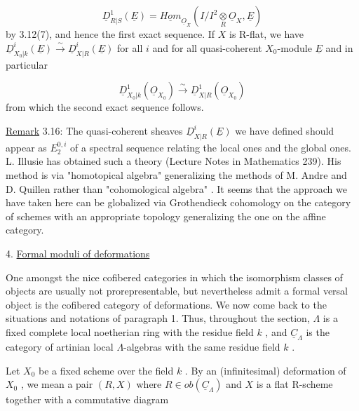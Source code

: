 \begin{equation*}
\underline{D}^1_{R|S}(\underline{E}) = \underline{Hom}_{\underline{O}_X}(I/I^2\underset{R}{\otimes}\underline{O}_X, \underline{E})
\end{equation*}
by 3.12(7), and hence the first exact sequence. If  $X$  is R-flat, we have
$\underline{D}^i_{X_0|k}(\underline{E}) \overset{\sim}{\to} \underline{D}^i_{X|R}(\underline{E})$  for all  $i$  and for all quasi-coherent $X_0$-module  $\underline{E}$  and in particular

\begin{equation*}
\underline{D}^1_{X_0|k}(\underline{O}_{X_0}) \overset{\sim}{\to} \underline{D}^1_{X|R}(\underline{O}_{X_0})
\end{equation*}
from which the second exact sequence follows.

\underline{Remark} 3.16:  The quasi-coherent sheaves  $\underline{D}^i_{X|R}(\underline{E})$  we have defined should appear as  $E_2^{0,i}$  of a spectral sequence relating the local ones and the global ones. L. Illusie has obtained such a theory (Lecture Notes in Mathematics 239). His method is via  "homotopical algebra"  generalizing the methods of M. Andre and D. Quillen rather than  "cohomological algebra" . It seems that the approach we have taken here can be globalized via Grothendieck cohomology on the category of schemes with an appropriate topology generalizing the one on the affine category.


4.  \underline{Formal moduli of deformations}

One amongst the nice cofibered categories in which the isomorphism classes of objects are usually not prorepresentable, but nevertheless admit a formal versal object is the cofibered category of deformations. We now come back to the situations and notations of paragraph 1. Thus, throughout the section,  $\Lambda$  is a fixed complete local noetherian ring with the residue field  $k$ , and  $\underline{C}_{\Lambda}$  is the category of artinian local $\Lambda$-algebras with the same residue field  $k$ .

Let  $X_0$  be a fixed scheme over the field  $k$ . By an (infinitesimal) deformation of  $X_0$ , we mean a pair  $(R, X)$  where  $R \in ob(\underline{C}_{\Lambda})$  and  $X$  is a flat R-scheme together with a commutative diagram


